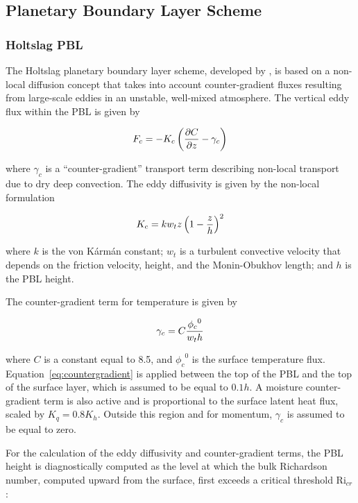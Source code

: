 \subsection{Planetary Boundary Layer Scheme}

\subsubsection{Holtslag PBL}

The Holtslag planetary boundary layer scheme, developed by \cite{Holtslag_90},
is based on a non-local diffusion concept that takes into account
counter-gradient fluxes resulting from large-scale eddies in an unstable,
well-mixed atmosphere.  The vertical eddy flux within the PBL is given by

\begin{eqnarray}
F_c = -K_c \left( {\partial{C} \over \partial{z}} - \gamma_c \right)
\end{eqnarray}

where $\gamma_c$ is a ``counter-gradient'' transport term describing
non-local transport due to dry deep convection.
The eddy diffusivity is given by the non-local formulation

\begin{eqnarray}
K_c = kw_tz \left( 1- {z \over h} \right)^2
\end{eqnarray}

where $k$ is the von K\'{a}rm\'{a}n constant; $w_t$ is a turbulent convective
velocity that depends on the friction velocity, height, and the Monin-Obukhov
length;  and $h$ is the PBL height.

The counter-gradient term for temperature is given by

\begin{eqnarray}
\label{eq:countergradient}
\gamma_c = C { {{\phi_c}^0} \over w_t h}
\end{eqnarray}

where $C$ is a constant equal to 8.5, and ${{\phi_c}^0}$ is the surface
temperature flux. Equation~\ref{eq:countergradient} is applied
between the top of the PBL and the top of the surface layer, which is assumed to
be equal to $0.1h$. A moisture counter-gradient term is also active and is
proportional to the surface latent heat flux, scaled by $K_q = 0.8 K_h$.
Outside this region and for momentum, $\gamma_c$ is assumed to be equal
to zero.

For the calculation of the eddy diffusivity and counter-gradient terms, the PBL
height is diagnostically computed as the level at which the bulk Richardson
number, computed upward from the surface, first exceeds a critical threshold
$\mathrm{Ri}_{cr}$:

